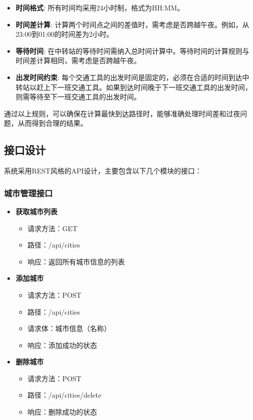 \documentclass[10pt]{article}
\begin{document}
    \begin{itemize}
        \item \textbf{时间格式}: 所有时间均采用24小时制，格式为HH:MM。
        \item \textbf{时间差计算}: 计算两个时间点之间的差值时，需考虑是否跨越午夜。例如，从23:00到01:00的时间差为2小时。
        \item \textbf{等待时间}: 在中转站的等待时间需纳入总时间计算中。等待时间的计算规则与时间差计算相同，需考虑是否跨越午夜。
        \item \textbf{出发时间约束}: 每个交通工具的出发时间是固定的，必须在合适的时间到达中转站以赶上下一班交通工具。如果到达时间晚于下一班交通工具的出发时间，则需等待至下一班交通工具的出发时间。
    \end{itemize}

    通过以上规则，可以确保在计算最快到达路径时，能够准确处理时间差和过夜问题，从而得到合理的结果。

    \subsection{接口设计}
    系统采用REST风格的API设计，主要包含以下几个模块的接口：

    \subsubsection{城市管理接口}
    \begin{itemize}
        \item \textbf{获取城市列表}
        \begin{itemize}
            \item 请求方法：GET
            \item 路径：/api/cities
            \item 响应：返回所有城市信息的列表
        \end{itemize}
        \item \textbf{添加城市}
        \begin{itemize}
            \item 请求方法：POST
            \item 路径：/api/cities
            \item 请求体：城市信息（名称）
            \item 响应：添加成功的状态
        \end{itemize}
        \item \textbf{删除城市}
        \begin{itemize}
            \item 请求方法：POST
            \item 路径：/api/cities/delete
            \item 响应：删除成功的状态
        \end{itemize}
    \end{itemize}
\end{document}
